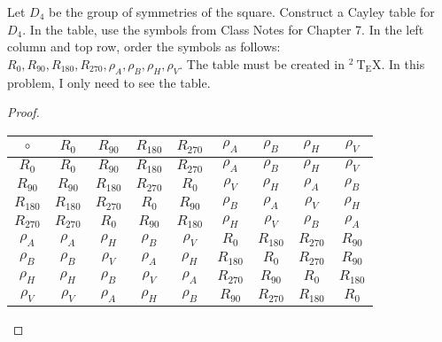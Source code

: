 \documentclass[12pt]{article}
\newenvironment{problem}[2][Problem]{\begin{trivlist}
\item[\hskip \labelsep {\bfseries #1}\hskip \labelsep {\bfseries #2.}]}{\end{trivlist}}
\begin{document}
\begin{problem}{3}
Let $D_{4}$ be the group of symmetries of the square. Construct a Cayley table for $D_{4}$. In the table, use the symbols from Class Notes for Chapter 7. In the left column and top row, order the symbols as follows: $R_{0}, R_{90}, R_{180}, R_{270}, \rho_{A}, \rho_{B}, \rho_{H}, \rho_{V}$. The table must be created in ${ }^{2} \mathrm{~T}_{\mathrm{E}} \mathrm{X}$. In this problem, I only need to see the table.
\begin{proof}
	\begin{tabular}{|c|c|c|c|c|c|c|c|c|}
	\hline
	\( \circ \)    & \(R_{0}\) & \(R_{90}\) & \(R_{180}\) & \(R_{270}\) & \(\rho_A\) & \(\rho_B\) & \(\rho_H\) & \(\rho_V\) \\
	\hline
	\(R_{0}\) & \(R_{0}\)  & \(R_{90}\)  & \(R_{180}\)  & \(R_{270}\)  & \(\rho_A\)  & \(\rho_B\)  & \(\rho_H\)  & \(\rho_V\)  \\
	\hline
	\(R_{90}\) & \(R_{90}\) & \(R_{180}\) & \(R_{270}\)  & \(R_{0}\)    & \(\rho_V\)  & \(\rho_H\)  & \(\rho_A\)  & \(\rho_B\)  \\
	\hline
	\(R_{180}\) & \(R_{180}\) & \(R_{270}\) & \(R_{0}\)    & \(R_{90}\)   & \(\rho_B\)  & \(\rho_A\)  & \(\rho_V\)  & \(\rho_H\)  \\
	\hline
	\(R_{270}\) & \(R_{270}\) & \(R_{0}\)   & \(R_{90}\)   & \(R_{180}\)  & \(\rho_H\)  & \(\rho_V\)  & \(\rho_B\)  & \(\rho_A\)  \\
	\hline
	\(\rho_A\)  & \(\rho_A\) & \(\rho_H\)   & \(\rho_B\)    & \(\rho_V\)    & \(R_{0}\)  & \(R_{180}\) & \(R_{270}\) & \(R_{90}\) \\
	\hline
	\(\rho_B\)  & \(\rho_B\) & \(\rho_V\)   & \(\rho_A\)    & \(\rho_H\)    & \(R_{180}\) & \(R_{0}\)  & \(R_{270}\) & \(R_{90}\) \\
	\hline
	\(\rho_H\)  & \(\rho_H\) & \(\rho_B\)   & \(\rho_V\)    & \(\rho_A\)    & \(R_{270}\) & \(R_{90}\) & \(R_{0}\)  & \(R_{180}\) \\
	\hline
	\(\rho_V\)  & \(\rho_V\) & \(\rho_A\)   & \(\rho_H\)    & \(\rho_B\)    & \(R_{90}\) & \(R_{270}\) & \(R_{180}\)  & \(R_{0}\)  \\
	\hline
	\end{tabular}
\end{proof}
\end{problem}
\end{document}
